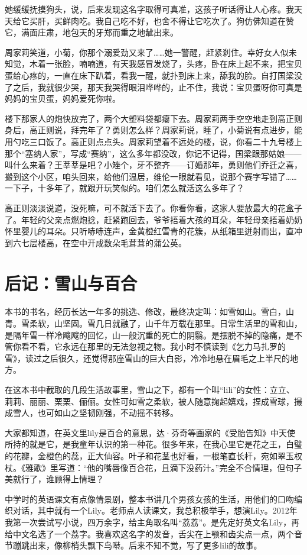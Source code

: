 \documentclass[lang=cn,newtx,12pt,scheme=chinese]{elegantbook}
\begin{document}
她缓缓抚摸狗头，说，后来发现这名字取得可真准，这孩子听话得让人心疼。我天天给它买肝，买鲜肉吃。我自己吃不好，也舍不得让它吃次了。狗仿佛知道在赞它，满面庄肃，地包天的牙郑而重之地龇出来。

周家莉笑道，小菊，你那个溺爱劲又来了……她一警醒，赶紧刹住。幸好女人似未知觉，木着一张脸，喃喃道，有天我感冒发烧了，头疼，卧在床上起不来，把宝贝蛋给心疼的，一直在床下趴着，看我一醒，就扑到床上来，舔我的脸。自打国梁没了之后，我就很少哭，那天我哭得眼泪哗哗的，止不住，我说：宝贝蛋呀你可真是妈妈的宝贝蛋，妈妈爱死你啦。

楼下那家人的炮快放完了，两个大塑料袋都瘪下去。周家莉两手空空地走到高正则身后，高正则说，拜完年了？勇则怎么样？周家莉说，睡了，小菊说有点进步，能用勺吃三口饭了。高正则点点头。周家莉望着不远处的楼，说，你看二十九号楼上那个“塞纳人家”，写成“赛纳”，这么多年都没改，你记不记得，国梁跟那姑娘——叫什么来着？王莘莘是吧？小矬个，牙不整齐——订婚那年，勇则他们乔迁之喜，搬到这个小区，咱头回来，给他们温居，维伦一眼就看见，说那个赛字写错了……一下子，十多年了，就跟开玩笑似的。咱们怎么就活这么多年了？

高正则淡淡说道，没死嘛，可不就活下去了。你看你看，这家人要放最大的花盒子了。年轻的父亲点燃炮捻，赶紧跑回去，爷爷捂着大孩的耳朵，年轻母亲捂着奶奶怀里婴儿的耳朵。只听哧哧连声，金黄橙红雪青的花簇，从纸箱里迸射而出，直冲到六七层楼高，在空中开成数朵毛茸茸的蒲公英。
\chapter{后记：雪山与百合}
本书的书名，经历长达一年多的挑选、修改，最终决定叫：如雪如山。雪白，山青。雪柔软，山坚固。雪几日就融了，山千年万载在那里。日常生活里的雪和山，是隔年雪一样冷飕飕的回忆，山一般沉重的死亡的阴翳。是摆脱不掉的隐痛，是不管你看不看，它永远在那里的无法忽视之物。我小时不慎读到《乞力马扎罗的雪》，读过之后很久，还觉得那座雪山的巨大白影，冷冷地悬在眉毛之上半尺的地方。

在这本书中截取的几段生活故事里，雪山之下，都有一个叫“lili”的女性：立立、莉莉、丽丽、栗栗、俪俪。女性可如雪之柔软，被人随意掬起嬉戏，捏成雪球，撮成雪人，也可如山之坚韧刚强，不动摇不转移。

大家都知道，在英文里lily是百合的意思，达·芬奇等画家的《受胎告知》中天使所持的就是它，是我童年认识的第一种花。很多年来，在我心里它是花之王，白璧的花瓣，金橙色的蕊，正大仙容。叶子和花茎也好看，一根笔直长杆，宛如翠玉权杖。《雅歌》里写道：“他的嘴唇像百合花，且滴下没药汁。”完全不合情理，但句子美就行了，谁顾得上情理？

中学时的英语课文有点像情景剧，整本书讲几个男孩女孩的生活，用他们的口吻编织对话，其中就有一个Lily。老师点人读课文，我总积极举手，想演Lily。2012年我第一次尝试写小说，四万余字，给主角取名叫“荔荔”。是先定好英文名Lily，再给中文名选了一个荔字。我喜欢这名字的发音，舌尖在上颚和齿尖点一点，两个音节蹦跳出来，像柳梢头飘下鸟啭。后来不知不觉，写了更多lili的故事。
\end{document}
